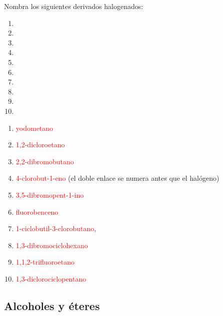 \begin{exercise}
    Nombra los siguientes derivados halogenados:
    \begin{enumerate}[label=\alph*)]
        \item {}
        \item {}
        \item {}
        \item {}
        \item {}
        \item {}
        \item {}
        \item {}
        \item {}
        \item {}
    \end{enumerate}
    \begin{solu}
        \begin{enumerate}[label=\alph*)]
            \item \textcolor{red}{yodometano}
            \item \textcolor{red}{1,2-dicloroetano}
            \item \textcolor{red}{2,2-dibromobutano}
            \item \textcolor{red}{4-clorobut-1-eno} (el doble enlace se numera antes que el halógeno)
            \item \textcolor{red}{3,5-dibromopent-1-ino}
            \item \textcolor{red}{fluorobenceno}
            \item \textcolor{red}{1-ciclobutil-3-clorobutano}, 
            \item \textcolor{red}{1,3-dibromociclohexano}
            \item \textcolor{red}{1,1,2-trifluoroetano}
            \item \textcolor{red}{1,3-diclorociclopentano}
        \end{enumerate}
    \end{solu}
\end{exercise}

\subsection*{Alcoholes y éteres}

